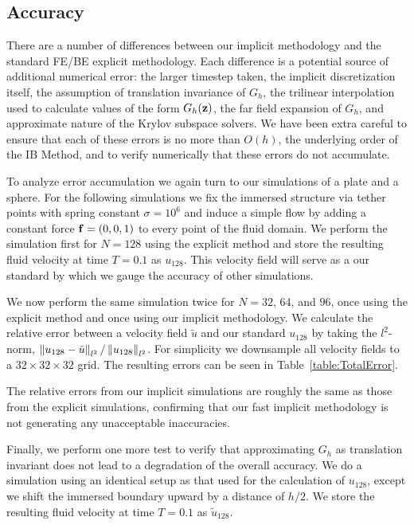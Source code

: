 \subsection{Accuracy}
There are a number of differences between our implicit methodology and the standard FE/BE explicit methodology. Each difference is a potential source of additional numerical error: the larger timestep taken, the implicit discretization itself, the assumption of translation invariance of $G_h$, the trilinear interpolation used to calculate values of the form $G_h(\mathbf{z})$, the far field expansion of $G_h$, and approximate nature of  the Krylov subspace solvers. We have been extra careful to ensure that each of these errors is 
 no more than $O(h)$, the underlying order of the IB Method, and to verify numerically that these errors do not accumulate. 
 
To analyze error accumulation we again turn to our simulations of a plate and a sphere. For the following simulations we fix the immersed structure via tether points with spring constant $\sigma=10^6$ and induce a simple flow by adding a constant force $\mathbf{f} = (0,0,1)$ to every point of the fluid domain. We perform the simulation first for $N=128$ using the explicit method and store the resulting fluid velocity at time $T=0.1$ as $u_{128}$. This velocity field will serve as a our standard by which we gauge the accuracy of other simulations.

We now perform the same simulation twice for $N=32$, $64$, and $96$, once using the explicit method and once using our implicit methodology. We calculate the relative error between a velocity field $\tilde{u}$ and our standard $u_{128}$ by taking the $l^2$-norm, $\left\lVert u_{128} - \tilde{u}\right\rVert_{l^2} / \left\lVert u_{128}\right\rVert_{l^2}$. For simplicity we downsample all velocity fields to a $32\times 32\times 32$ grid. The resulting errors can be seen in Table~\ref{table:TotalError}.

The relative errors from our implicit simulations are roughly the same as those from the explicit simulations, confirming that our fast implicit methodology is not generating any unacceptable inaccuracies.


Finally, we perform one more test to verify that approximating $G_h$ as translation invariant does not lead to a degradation of the overall accuracy. We do a simulation using an identical setup as that used for the calculation of $u_{128}$, except we shift the immersed boundary upward by a distance of $h/2$. We store the resulting fluid velocity at time $T=0.1$ as $\tilde{u}_{128}$.

